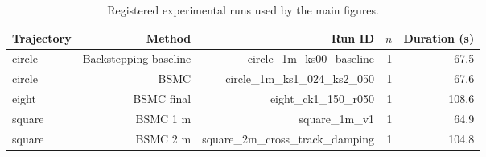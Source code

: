 \begin{table}[!t]
\centering
\caption{Registered experimental runs used by the main figures.}
\label{tab:protocol}
\begin{tabular}{lrrrr}
\hline
Trajectory & Method & Run ID & $n$ & Duration (s) \\
\hline
circle & Backstepping baseline & circle\_1m\_ks00\_baseline & 1 & 67.5 \\
circle & BSMC & circle\_1m\_ks1\_024\_ks2\_050 & 1 & 67.6 \\
eight & BSMC final & eight\_ck1\_150\_r050 & 1 & 108.6 \\
square & BSMC 1 m & square\_1m\_v1 & 1 & 64.9 \\
square & BSMC 2 m & square\_2m\_cross\_track\_damping & 1 & 104.8 \\
\hline
\end{tabular}
\end{table}
